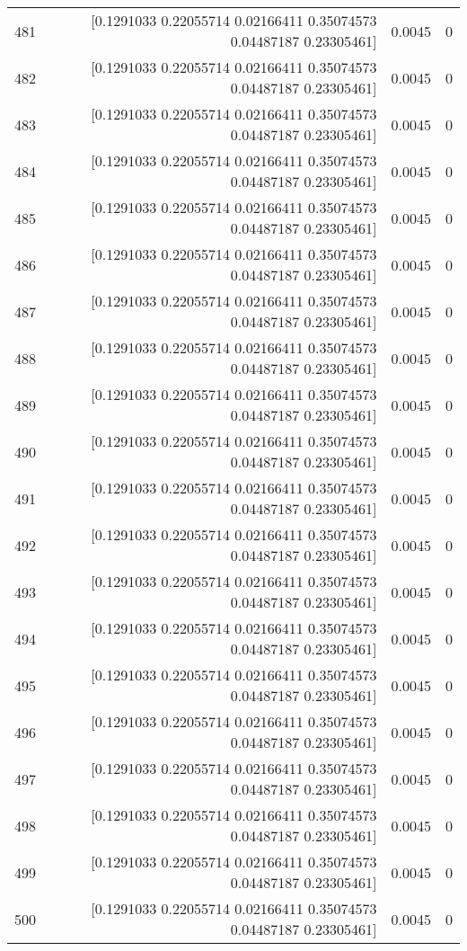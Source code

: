 \begin{longtable}{lrrr}
481 & [0.1291033  0.22055714 0.02166411 0.35074573 0.04487187 0.23305461] & 0.0045 & 0 \\
482 & [0.1291033  0.22055714 0.02166411 0.35074573 0.04487187 0.23305461] & 0.0045 & 0 \\
483 & [0.1291033  0.22055714 0.02166411 0.35074573 0.04487187 0.23305461] & 0.0045 & 0 \\
484 & [0.1291033  0.22055714 0.02166411 0.35074573 0.04487187 0.23305461] & 0.0045 & 0 \\
485 & [0.1291033  0.22055714 0.02166411 0.35074573 0.04487187 0.23305461] & 0.0045 & 0 \\
486 & [0.1291033  0.22055714 0.02166411 0.35074573 0.04487187 0.23305461] & 0.0045 & 0 \\
487 & [0.1291033  0.22055714 0.02166411 0.35074573 0.04487187 0.23305461] & 0.0045 & 0 \\
488 & [0.1291033  0.22055714 0.02166411 0.35074573 0.04487187 0.23305461] & 0.0045 & 0 \\
489 & [0.1291033  0.22055714 0.02166411 0.35074573 0.04487187 0.23305461] & 0.0045 & 0 \\
490 & [0.1291033  0.22055714 0.02166411 0.35074573 0.04487187 0.23305461] & 0.0045 & 0 \\
491 & [0.1291033  0.22055714 0.02166411 0.35074573 0.04487187 0.23305461] & 0.0045 & 0 \\
492 & [0.1291033  0.22055714 0.02166411 0.35074573 0.04487187 0.23305461] & 0.0045 & 0 \\
493 & [0.1291033  0.22055714 0.02166411 0.35074573 0.04487187 0.23305461] & 0.0045 & 0 \\
494 & [0.1291033  0.22055714 0.02166411 0.35074573 0.04487187 0.23305461] & 0.0045 & 0 \\
495 & [0.1291033  0.22055714 0.02166411 0.35074573 0.04487187 0.23305461] & 0.0045 & 0 \\
496 & [0.1291033  0.22055714 0.02166411 0.35074573 0.04487187 0.23305461] & 0.0045 & 0 \\
497 & [0.1291033  0.22055714 0.02166411 0.35074573 0.04487187 0.23305461] & 0.0045 & 0 \\
498 & [0.1291033  0.22055714 0.02166411 0.35074573 0.04487187 0.23305461] & 0.0045 & 0 \\
499 & [0.1291033  0.22055714 0.02166411 0.35074573 0.04487187 0.23305461] & 0.0045 & 0 \\
500 & [0.1291033  0.22055714 0.02166411 0.35074573 0.04487187 0.23305461] & 0.0045 & 0 \\
\end{longtable}